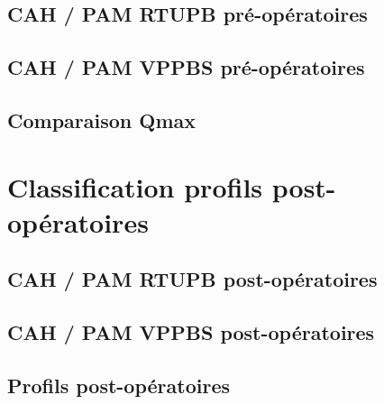 \documentclass[12pt]{article}
\begin{document}
\subsection{CAH / PAM RTUPB pré-opératoires }
	  
\subsection{CAH / PAM VPPBS  pré-opératoires }
	  
\subsection{Comparaison Qmax }
	  

%


\section{Classification profils post-opératoires}
\subsection{CAH / PAM RTUPB post-opératoires}
	  
\subsection{CAH / PAM VPPBS post-opératoires}
	  
\subsection{Profils post-opératoires}
	  




\end{document}
